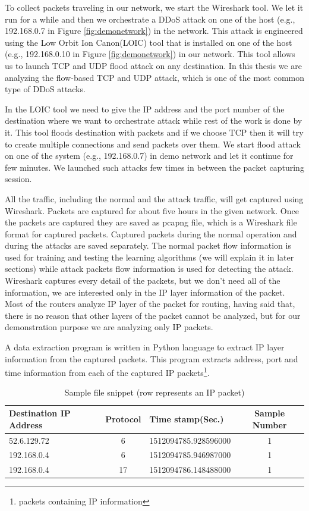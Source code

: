 \documentclass[12pt,oneside,a4paper]{article}
\begin{document}
To collect packets traveling in our network, we start the Wireshark tool. We let it run for a while and then we orchestrate a DDoS attack on one of the host (e.g., 192.168.0.7 in Figure \ref{fig:demonetwork}) in the network. This attack is engineered using the Low Orbit Ion Canon(LOIC) tool that is installed on one of the host (e.g., 192.168.0.10 in Figure \ref{fig:demonetwork}) in our network. This tool allows us to launch TCP and UDP flood attack on any destination. In this thesis we are analyzing the flow-based TCP and UDP attack, which is one of the most common type of DDoS attacks.

In the LOIC tool we need to give the IP address and the port number of the destination where we want to orchestrate attack while rest of the work is done by it. This tool floods destination with packets and if we choose TCP then it will try to create multiple connections and send packets over them. We start flood attack on one of the system (e.g., 192.168.0.7) in demo network and let it continue for few minutes. We launched such attacks few times in between the packet capturing session.

All the traffic, including the normal and the attack traffic, will get captured using Wireshark. Packets are captured for about five hours in the given network. Once the packets are captured they are saved as pcapng file, which is a Wireshark file format for captured packets. Captured packets during the normal operation and during the attacks are saved separately. The normal packet flow information is used for training and testing the learning algorithms (we will explain it in later sections) while attack packets flow information is used for detecting the attack. Wireshark captures every detail of the packets, but we don't need all of the information, we are interested only in the IP layer information of the packet. Most of the routers analyze IP layer of the packet for routing, having said that, there is no reason that other layers of the packet cannot be analyzed, but for our demonstration purpose we are analyzing only IP packets.\par

A data extraction program is written in Python language to extract IP layer information from the captured packets. This program extracts address, port and time information from each of the captured IP packets\footnote{packets containing IP information}.

\begin{table}[H]
\centering
  \begin{tabular}{| l | c | l | c |}
    \hline
    Destination IP Address      & Protocol  & Time stamp(Sec.)  & Sample Number \\
    \hline
    52.6.129.72         & 6         & 1512094785.928596000  & 1 \\ \hline
    192.168.0.4         & 6         & 1512094785.946987000  & 1 \\ \hline
    192.168.0.4         & 17        & 1512094786.148488000  & 1 \\ \hline
  \end{tabular}
\caption{Sample file snippet (row represents an IP packet)} \label{table:sample-file-snippet}
\end{table}
\end{document}
